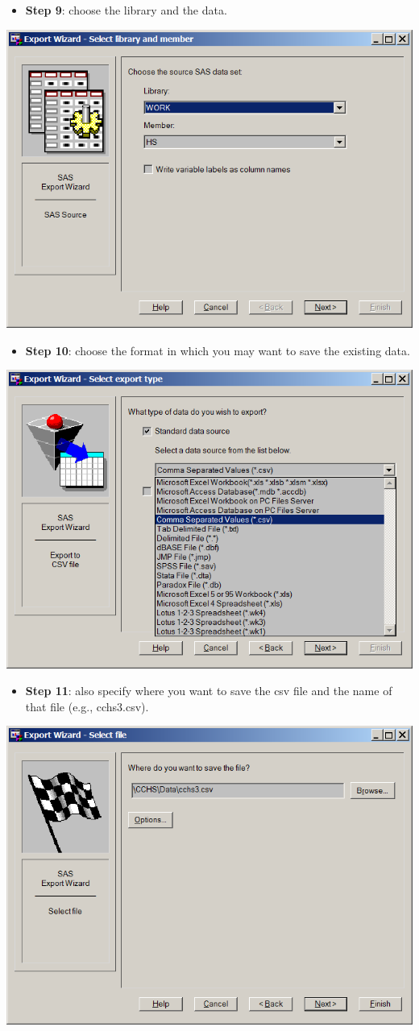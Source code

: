 \documentclass[
]{book}
\providecommand{\tightlist}{%
  \setlength{\itemsep}{0pt}\setlength{\parskip}{0pt}}
\begin{document}
\begin{itemize}
\tightlist
\item
  \textbf{Step 9}: choose the library and the data.
\end{itemize}

\includegraphics[width=0.65\linewidth]{images/abacus22}

\begin{itemize}
\tightlist
\item
  \textbf{Step 10}: choose the format in which you may want to save the existing data.
\end{itemize}

\includegraphics[width=0.65\linewidth]{images/abacus23}

\begin{itemize}
\tightlist
\item
  \textbf{Step 11}: also specify where you want to save the csv file and the name of that file (e.g., cchs3.csv).
\end{itemize}

\includegraphics[width=0.65\linewidth]{images/abacus24}
\end{document}
